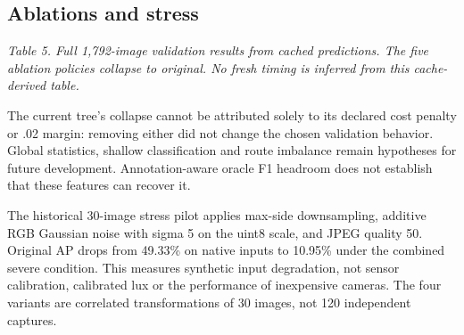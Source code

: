 \documentclass[11pt,a4paper]{article}
\begin{document}
\subsection{Ablations and stress}

\begin{center}\small{}\end{center}

\emph{Table 5. Full 1,792-image validation results from cached predictions. The five ablation policies collapse to original. No fresh timing is inferred from this cache-derived table.}


The current tree's collapse cannot be attributed solely to its declared cost penalty or .02 margin: removing either did not change the chosen validation behavior. Global statistics, shallow classification and route imbalance remain hypotheses for future development. Annotation-aware oracle F1 headroom does not establish that these features can recover it.


The historical 30-image stress pilot applies max-side downsampling, additive RGB Gaussian noise with sigma 5 on the uint8 scale, and JPEG quality 50. Original AP drops from 49.33\% on native inputs to 10.95\% under the combined severe condition. This measures synthetic input degradation, not sensor calibration, calibrated lux or the performance of inexpensive cameras. The four variants are correlated transformations of 30 images, not 120 independent captures.
\end{document}
